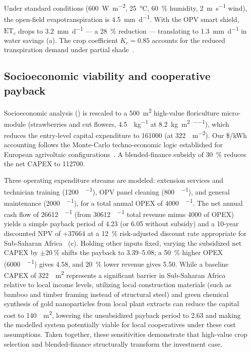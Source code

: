 \documentclass[preprint,12pt]{elsarticle}
\begin{document}
Under standard conditions (\qty{600}{\W\per\m\squared}, \qty{25}{\celsius}, \qty{60}{\percent} humidity, \qty{2}{\m\per\s} wind), the open-field evapotranspiration is \qty{4.5}{\mm\per\day}.
With the OPV smart shield, $\mathrm{ET}_c$ drops to \qty{3.2}{\mm\per\day} --- a \qty{28}{\percent} reduction --- translating to \qty{1.3}{\mm\per\day} in water savings (a).
The crop coefficient $K_c = 0.85$ accounts for the reduced transpiration demand under partial shade~\cite{Allen1998}.

\subsection*{Socioeconomic viability and cooperative payback}

Socioeconomic analysis () is rescaled to a \qty{500}{\m\squared} high-value floriculture micro-module (strawberries and cut flowers, \qty{4.5}{\USD\per\kg} at \qty{8.2}{\kg\per\m\squared\per\yr}), which reduces the entry-level capital expenditure to \qty{161000}{\USD} (at \qty{322}{\USD\per\m\squared}). Our \$/kWh accounting follows the Monte-Carlo techno-economic logic established for European agrivoltaic configurations~\cite{Zidane2025}.
A blended-finance subsidy of \qty{30}{\percent} reduces the net CAPEX to \qty{112700}{\USD}.

Three operating expenditure streams are modeled: extension services and technician training (\qty{1200}{\USD\per\yr}), OPV panel cleaning (\qty{800}{\USD\per\yr}), and general maintenance (\qty{2000}{\USD\per\yr}), for a total annual OPEX of \qty{4000}{\USD\per\yr}.
The net annual cash flow of \qty{26612}{\USD\per\yr} (from \qty{30612}{\USD\per\yr} total revenue minus \qty{4000}{\USD} of OPEX) yields a simple payback period of \qty{4.23}{\yr} (or \qty{6.05}{\yr} without subsidy) and a 10-year discounted NPV of $+$\qty{37664}{\USD} at a \qty{12}{\percent} risk-adjusted discount rate appropriate for Sub-Saharan Africa~\cite{Ringstrom2026} (c). Holding other inputs fixed, varying the subsidized net CAPEX by $\pm\qty{20}{\percent}$ shifts the payback to \qtyrange{3.39}{5.08}{\yr}; a \qty{50}{\percent} higher OPEX (\qty{6000}{\USD\per\yr}) gives \qty{4.58}{\yr}, and \qty{20}{\percent} lower revenue gives \qty{5.50}{\yr}.
While a baseline CAPEX of \qty{322}{\per\m\squared} represents a significant barrier in Sub-Saharan Africa relative to local income levels, utilizing local construction materials (such as bamboo and timber framing instead of structural steel) and green chemical synthesis of gold nanoparticles from local plant extracts can reduce the capital cost to \qty{140}{\per\m\squared}, lowering the unsubsidized payback period to \qty{2.63}{\yr} and making the modelled system potentially viable for local cooperatives under these cost assumptions.
Taken together, these sensitivities demonstrate that high-value crop selection and blended-finance structurally transform the investment case.
\end{document}
